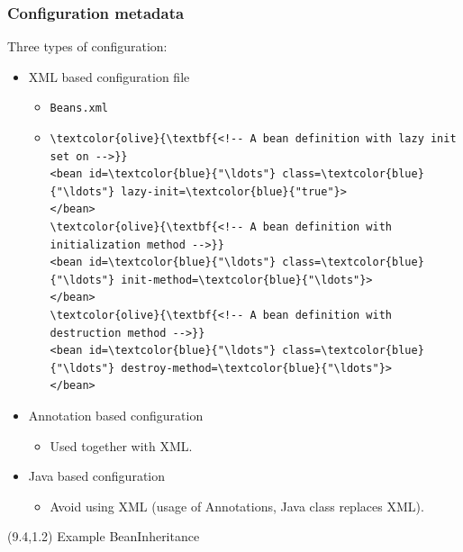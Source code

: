 \documentclass[10pt,xcolor=pdflatex, table]{beamer}
\begin{document}
\begin{frame}[fragile]\frametitle{Configuration metadata}
Three types of configuration:
	\begin{itemize}
		\item XML based configuration file
          \begin{itemize}
        	\item \texttt{Beans.xml}
            \item[]
            	\medskip
            	\begin{Verbatim}[fontsize=\footnotesize, commandchars=\\\{\}]
\textcolor{olive}{\textbf{<!-- A bean definition with lazy init set on -->}}
<bean id=\textcolor{blue}{"\ldots"} class=\textcolor{blue}{"\ldots"} lazy-init=\textcolor{blue}{"true"}>
</bean>
\textcolor{olive}{\textbf{<!-- A bean definition with initialization method -->}}
<bean id=\textcolor{blue}{"\ldots"} class=\textcolor{blue}{"\ldots"} init-method=\textcolor{blue}{"\ldots"}>
</bean>
\textcolor{olive}{\textbf{<!-- A bean definition with destruction method -->}}
<bean id=\textcolor{blue}{"\ldots"} class=\textcolor{blue}{"\ldots"} destroy-method=\textcolor{blue}{"\ldots"}>
</bean>               
                \end{Verbatim}
          \end{itemize}
        \item Annotation based configuration
          \begin{itemize}
        	\item Used together with XML.
          \end{itemize}
        \item Java based configuration
          \begin{itemize}
        	\item Avoid using XML (usage of Annotations, Java class replaces XML).
          \end{itemize}
	\end{itemize}
\begin{textblock}{15}(9.4,1.2)
    {\footnotesize Example BeanInheritance}
\end{textblock}
\end{frame}
\end{document}
